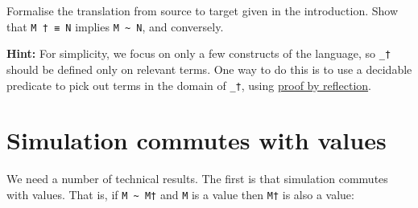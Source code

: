 Formalise the translation from source to target given in the
introduction. Show that \texttt{M\ †\ ≡\ N} implies
\texttt{M\ \textasciitilde{}\ N}, and conversely.

\textbf{Hint:} For simplicity, we focus on only a few constructs of the
language, so \texttt{\_†} should be defined only on relevant terms. One
way to do this is to use a decidable predicate to pick out terms in the
domain of \texttt{\_†}, using
\protect\hyperlink{Decidable-proof-by-reflection}{proof by reflection}.

\begin{fence}
\begin{code}%
\>[0]\<%
\end{code}
\end{fence}

\hypertarget{simulation-commutes-with-values}{%
\section{Simulation commutes with
values}\label{simulation-commutes-with-values}}

We need a number of technical results. The first is that simulation
commutes with values. That is, if \texttt{M\ \textasciitilde{}\ M†} and
\texttt{M} is a value then \texttt{M†} is also a value:

